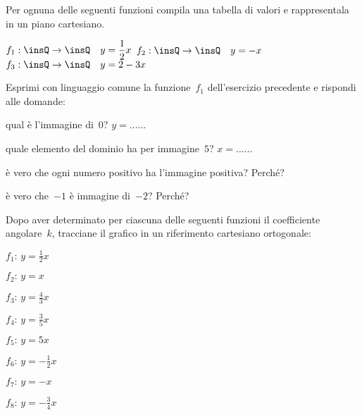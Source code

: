 \begin{esercizio}
\label{ese:D.37}
Per ognuna delle seguenti funzioni compila una tabella di valori e 
rappresentala in un piano cartesiano.

 $f_1:\insQ \rightarrow \insQ\quad y=\dfrac{1}{2}x$ \quad
 $f_2:\insQ \rightarrow \insQ\quad y=-x$ \quad
 $f_3:\insQ \rightarrow \insQ\quad y=2-3x$
\end{esercizio}

\begin{esercizio}
\label{ese:D.38}
Esprimi con linguaggio comune la funzione~$f_1$ dell'esercizio precedente e 
rispondi alle domande:

\begin{enumeratea}
\item qual è l'immagine di~$0$?  $y=\ldots \ldots $
\item quale elemento del dominio ha per immagine~$5$? $x=\ldots \ldots $
\item è vero che ogni numero positivo ha l'immagine positiva? Perché?
\item è vero che~$-1$ è immagine di~$-2$? Perché?
\end{enumeratea}
\end{esercizio}

\begin{esercizio}
\label{ese:D.39}
Dopo aver determinato per ciascuna delle seguenti funzioni il coefficiente 
angolare~$k$, tracciane il grafico in un riferimento cartesiano ortogonale:
\begin{multicols}{3}
 \begin{enumeratea}
\item $f_{1}:\, y=\frac{1}{2}x$
\item $f_{2}:\, y=x$
\item $f_{3}:\, y=\frac{4}{3}x$
\item $f_{4}:\, y=\frac{3}{5}x$
\item $f_{5}:\, y=5x$
\item $f_{6}:\, y=-{\frac{1}{2}}x$
\item $f_{7}:\, y=-x$
\item $f_{8}:\, y=-{\frac{3}{4}}x$
\end{enumeratea}
\end{multicols}
\end{esercizio}

